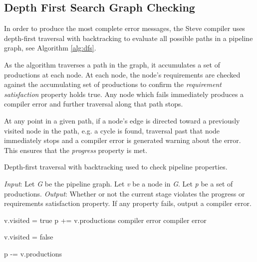 \subsection{Depth First Search Graph Checking} \label{guide:dfs_desc}

In order to produce the most complete error messages, the Steve compiler uses depth-first traversal with backtracking to evaluate all possible paths in a pipeline graph, see Algorithm \ref{alg:dfs}. 

As the algorithm traverses a path in the graph, it accumulates a set of productions at each node. At each node, the node's requirements are checked against the accumulating set of productions to confirm the \textit{requirement satisfaction} property holds true. Any node which fails immediately produces a compiler error and further traversal along that path stops.

At any point in a given path, if a node's edge is directed toward a previously visited node in the path, e.g. a cycle is found, traversal past that node immediately stops and a compiler error is generated warning about the error. This ensures that the \textit{progress} property is met.

\begin{algorithm}[ht]
 \caption{Depth-first traversal with backtracking used to check pipeline properties.}
 \label{alg:dfs}
 \begin{algorithmic}
 \State
 \State \textit{Input}: Let \textit{G} be the pipeline graph. Let \textit{v} be a node in \textit{G}. Let \textit{p} be a set of productions.
 \State \textit{Output}: Whether or not the current stage violates the progress or requirements satisfaction property. If any property fails, output a compiler error.
 \State

 	\State v.visited = true
 	\State p  += v.productions
 				\State {}
 			\Else
 				\State \Return compiler error
 			\EndIf
 		\EndFor
	\Else
 		\State \Return compiler error
 	\EndIf

 	\State v.visited = false 

 	\State p -= v.productions 
 \EndFunction
 \end{algorithmic}

\end{algorithm}

